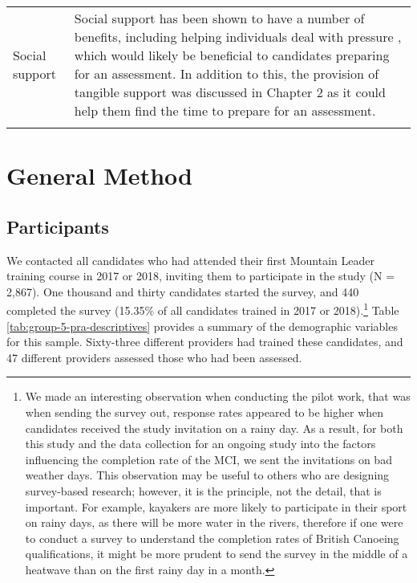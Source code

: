 \documentclass[
  12pt,
  a4paper,
]{book}
\begin{document}
\begin{landscape}
\begin{longtable}[t]{>{\raggedright\arraybackslash}p{3cm}>{\raggedright\arraybackslash}p{21cm}}
Social support & Social support has been shown to have a number of benefits, including helping individuals deal with pressure \citep{Freeman2011, Freeman2014}, which would likely be beneficial to candidates preparing for an assessment. In addition to this, the provision of tangible support was discussed in Chapter 2 as it could help them find the time to prepare for an assessment.\\*
\end{longtable}
\end{landscape}

\hypertarget{pra-general-method}{%
\section{General Method}\label{pra-general-method}}

\hypertarget{pra-participants}{%
\subsection{Participants}\label{pra-participants}}

We contacted all candidates who had attended their first Mountain Leader training course in 2017 or 2018, inviting them to participate in the study (N = 2,867). One thousand and thirty candidates started the survey, and 440 completed the survey (15.35\% of all candidates trained in 2017 or 2018).\footnote{We made an interesting observation when conducting the pilot work, that was when sending the survey out, response rates appeared to be higher when candidates received the study invitation on a rainy day. As a result, for both this study and the data collection for an ongoing study into the factors influencing the completion rate of the MCI, we sent the invitations on bad weather days. This observation may be useful to others who are designing survey-based research; however, it is the principle, not the detail, that is important. For example, kayakers are more likely to participate in their sport on rainy days, as there will be more water in the rivers, therefore if one were to conduct a survey to understand the completion rates of British Canoeing qualifications, it might be more prudent to send the survey in the middle of a heatwave than on the first rainy day in a month.} Table \ref{tab:group-5-pra-descriptives} provides a summary of the demographic variables for this sample. Sixty-three different providers had trained these candidates, and 47 different providers assessed those who had been assessed.
\end{document}
